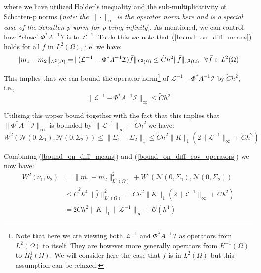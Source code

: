 where we have utilized Holder's inequality and the sub-multiplicativity of Schatten-p norms (\textit{note: the} $\|\cdot\|_{\infty}$ \textit{is the operator norm here and is a special case of the Schatten-p norm for p being infinity}). As mentioned, we can control how ``close" $\Phi^{*}A^{-1}\mathcal{I}$ is to $\mathcal{L}^{-1}$. To do this we note that (\ref{bound_on_diff_means}) holds for all $\bar{f}$ in $L^{2}(\Omega)$, i.e. we have:
\begin{equation*}
    \|m_1-m_2\|_{L^{2}(\Omega)}=\|(\mathcal{L}^{-1}-\Phi^{*}A^{-1}\mathcal{I})\bar{f}\|_{L^{2}(\Omega)}\leq \tilde{C}h^{2}\|\bar{f}\|_{L^2(\Omega)} \hspace{0.25cm} \forall\bar{f}\in L^{2}(\Omega)
\end{equation*}

This implies that we can bound the operator norm\footnote{Note that here we are viewing both $\mathcal{L}^{-1}$ and $\Phi^{*}A^{-1}\mathcal{I}$ as operators from $L^{2}(\Omega)$ to itself. They are however more generally operators from $H^{-1}(\Omega)$ to $H^{1}_{0}(\Omega)$. We will consider here the case that $\bar{f}$ is in $L^{2}(\Omega)$ but this assumption can be relaxed.} of $\mathcal{L}^{-1}-\Phi^{*}A^{-1}\mathcal{I}$ by $\tilde{C}h^{2}$, i.e.,
\begin{equation}
    \label{bound_on_diff_of_solution_operators}
    \|\mathcal{L}^{-1}-\Phi^{*}A^{-1}\mathcal{I}\|_{\infty}\leq \tilde{C}h^{2}
\end{equation}

Utilising this upper bound together with the fact that this implies that $\|\Phi^{*}A^{-1}\mathcal{I}\|_{\infty}$ is bounded by $\|\mathcal{L}^{-1}\|_{\infty}+\tilde{C}h^2$ we have:
\begin{equation}
    \label{bound_on_diff_cov_operators}
    W^{2}(\mathcal{N}(0,\Sigma_1),\mathcal{N}(0,\Sigma_2))\leq\|\Sigma_{1}-\Sigma_{2}\|_{1}\leq \tilde{C}h^{2}\|K\|_{1}\left(2\|\mathcal{L}^{-1}\|_{\infty}+\tilde{C}h^2\right)
\end{equation}

Combining (\ref{bound_on_diff_means}) and (\ref{bound_on_diff_cov_operators}) we now have:
\begin{align*}
    W^{2}(\nu_{1},\nu_{2})&=\|m_1-m_2\|_{L^{2}(\Omega)}^{2}+W^{2}(\mathcal{N}(0,\Sigma_1),\mathcal{N}(0,\Sigma_2)) \\
    &\leq \tilde{C}^{2}h^4\|\bar{f}\|^{2}_{L^{2}(\Omega)}+ \tilde{C}h^{2}\|K\|_{1}\left(2\|\mathcal{L}^{-1}\|_{\infty}+\tilde{C}h^2\right) \\
    &=2\tilde{C}h^{2}\|K\|_{1}\|\mathcal{L}^{-1}\|_{\infty}+\mathcal{O}(h^4)
\end{align*}

